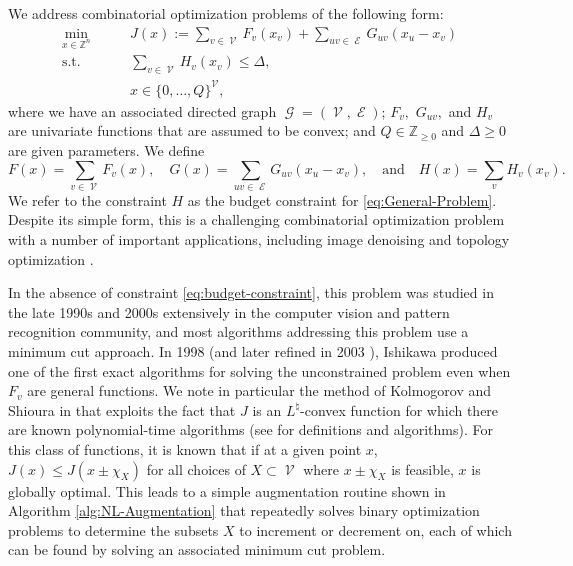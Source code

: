 \documentclass[pdflatex,sn-mathphys-num]{sn-jnl}%
\newcommand{\Z}{\mathbb{Z}} %
\DeclareMathOperator{\Gcal}{\mathcal{G}}
\DeclareMathOperator{\Ecal}{\mathcal{E}}
\DeclareMathOperator{\Vcal}{\mathcal{V}}
\begin{document}
We address combinatorial optimization problems of the following form:
\begin{subequations}
\begin{align}
    \min_{x\in \Z^n} \qquad& J(x) := \sum_{v \in \Vcal}F_v(x_v) + \sum_{uv \in \Ecal}G_{uv}(x_u -x_v) \\
    \text{s.t.} \qquad& \sum_{v \in \Vcal} H_v(x_v) \le \Delta, \label{eq:budget-constraint}\\ 
    &x \in \{0,\dots,Q\}^{\Vcal},
\end{align} \label{eq:General-Problem}%
\end{subequations}
where we have an associated directed graph $\Gcal = (\Vcal, \Ecal)$;  $F_v,$ $G_{uv},$ and $H_v$ are univariate functions that are assumed to be convex; and $Q \in \mathbb{Z}_{\ge 0}$ and $\Delta \ge 0$ are given parameters. We define
\begin{equation}
F(x) = \sum_{v\in \Vcal}F_v(x), \quad G(x) = \sum_{uv \in \Ecal}G_{uv}(x_u - x_v), \quad \text{and} \quad  H(x) = \sum_v H_v(x_v).
\label{eq:obj-graph-structure}
\end{equation}
We refer to the constraint $H$ as the budget constraint for \eqref{eq:General-Problem}.
Despite its simple form, 
this is a challenging combinatorial optimization problem with a number of important applications, including image denoising \cite{rudin1992nonlinear} and topology optimization \cite{manns2024discrete}. 


In the absence of constraint \eqref{eq:budget-constraint}, this problem was studied in the late 1990s and 2000s extensively in the computer vision and pattern recognition community, and most algorithms addressing this problem use a minimum cut approach. 
In 1998 \cite{ishikawa1998segmentation} (and later refined in 2003 \cite{ishikawa2003exact}), Ishikawa produced one of the first exact algorithms for solving the unconstrained problem even when $F_v$ are general functions. 
We note in particular the method of Kolmogorov and Shioura in \cite{kolmogorov2009new} that exploits the fact that $J$ is an $L^{\natural}$-convex function for which there are known polynomial-time algorithms (see \cite{murota2004optimality,murota2004steepest} for definitions and algorithms). 
For this class of functions, it is known that if at a given point $x$, $J(x) \le J(x \pm \chi_X)$ for all choices of $X \subset \Vcal$ where $x \pm \chi_X$ is feasible, $x$ is globally optimal. 
This leads to a simple augmentation routine shown in Algorithm \ref{alg:NL-Augmentation} that repeatedly solves binary optimization problems to determine the subsets $X$ to increment or decrement on, each of which can be found by solving an associated minimum cut problem.
\end{document}
